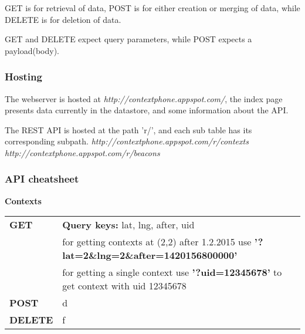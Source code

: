 GET is for retrieval of data, POST is for either creation or merging of data, while DELETE is for deletion of data.

GET and DELETE expect query parameters, while POST expects a payload(body).

\subsubsection{Hosting}
The webserver is hosted at \textit{http://contextphone.appspot.com/}, the index page presents data currently in the datastore, and some information about the API.

The REST API is hosted at the path 'r/', and each sub table has its corresponding subpath.
\textit{http://contextphone.appspot.com/r/contexts}\\
\textit{http://contextphone.appspot.com/r/beacons}

\subsubsection{API cheatsheet}

\textbf{Contexts}


\begin{tabular}{l|l}
\textbf{GET} & \textbf{Query keys:} lat, lng, after, uid\\
 & for getting contexts at (2,2) after 1.2.2015 use \textbf{'?lat=2\&lng=2\&after=1420156800000'}\\
 & for getting a single context use \textbf{'?uid=12345678'} to get context with uid 12345678\\
\textbf{POST} & d\\
\textbf{DELETE} & f\\
\end{tabular}

